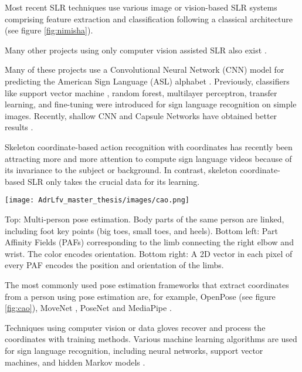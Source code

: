 Most recent SLR techniques use various image or vision-based SLR systems comprising feature extraction and classification following a classical architecture \cite{nimisha2020brief} (see figure \ref{fig:nimisha}). 

Many other projects using only computer vision assisted SLR also exist  \cite{nimisha2020brief} \cite{admasu2010ethiopian} \cite{deriche2019intelligent} \cite{ahram2021advances} \cite{song2021intelligent} \cite{lee2021american} \cite{lee2021comparative} \cite{gao2021rnn}. 

Many of these projects use a Convolutional Neural Network (CNN) model for predicting the American Sign Language (ASL) alphabet \cite{bin2019study}. Previously, classifiers like support vector machine \cite{savur2015real}, random forest, multilayer perceptron, transfer learning, and fine-tuning \cite{saleh2020arabic} were introduced for sign language recognition on simple images. Recently, shallow CNN and Capsule Networks have obtained better results \cite{hasan2020classification}. 

Skeleton coordinate-based action recognition with coordinates has recently been attracting more and more attention to compute sign language videos because of its invariance to the subject or background. In contrast, skeleton coordinate-based SLR only takes the crucial data for its learning. 

\begin{marginfigure}
    \centering
    \texttt{[image: AdrLfv\_master\_thesis/images/cao.png]}
    \caption{Top: Multi-person pose estimation. Body parts of the same person are linked, including foot key points (big toes, small toes, and heels). Bottom left: Part Affinity Fields (PAFs) corresponding to the limb connecting the right elbow and wrist. The color encodes orientation. Bottom right: A 2D vector in each pixel of every PAF encodes the position and orientation of the limbs.}
    \label{fig:cao}
\end{marginfigure}

The most commonly used pose estimation frameworks that extract coordinates from a person using pose estimation are, for example, OpenPose \cite{cao2017realtime} (see figure \ref{fig:cao}), MoveNet \cite{movenet}, PoseNet \cite{kendall2015posenet} and MediaPipe \cite{lugaresi2019mediapipe}.



Techniques using computer vision or data gloves recover and process the coordinates with training methods. Various machine learning algorithms are used for sign language recognition, including neural networks, support vector machines, and hidden Markov models \cite{9178440}.

